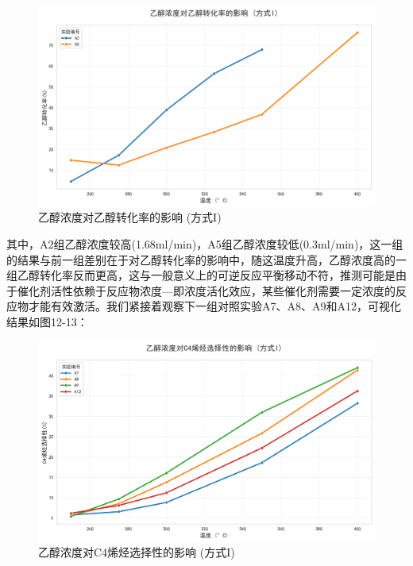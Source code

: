 \begin{figure}[h]%
	\centering%
	\includegraphics [scale=0.6]{图/2-2-2-2.png}
	\caption{乙醇浓度对乙醇转化率的影响 (方式I)} 
	\label{fig:1}
\end{figure}

其中，A2组乙醇浓度较高(1.68ml/min)，A5组乙醇浓度较低(0.3ml/min)，这一组的结果与前一组差别在于对乙醇转化率的影响中，随这温度升高，乙醇浓度高的一组乙醇转化率反而更高，这与一般意义上的可逆反应平衡移动不符，推测可能是由于催化剂活性依赖于反应物浓度—即浓度活化效应，某些催化剂需要一定浓度的反应物才能有效激活。我们紧接着观察下一组对照实验A7、A8、A9和A12，可视化结果如图12-13：

\begin{figure}[h]%
	\centering%
	\includegraphics [scale=0.6]{图/2-2-3-1.png}
	\caption{乙醇浓度对C4烯烃选择性的影响 (方式I)} 
	\label{fig:1}
\end{figure}

